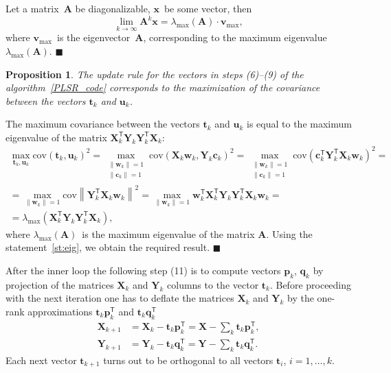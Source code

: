 \documentclass[12pt,oneside]{article}
\newtheorem{proposition}{Proposition}
\theoremstyle{definition}
\newcommand{\bx}{\mathbf{x}}
\newcommand{\bw}{\mathbf{w}}
\newcommand{\bY}{\mathbf{Y}}
\newcommand{\bX}{\mathbf{X}}
\newcommand{\bu}{\mathbf{u}}
\newcommand{\bt}{\mathbf{t}}
\newcommand{\bp}{\mathbf{p}}
\newcommand{\bq}{\mathbf{q}}
\newcommand{\bc}{\mathbf{c}}
\newcommand{\T}{\mathsf{T}}
\begin{document}
Let a matrix~$\mathbf{A}$ be diagonalizable, $\bx$~be some vector, then
\begin{equation}
\lim_{k \rightarrow \infty} \mathbf{A}^k \bx = \lambda_{\max}(\mathbf{A}) \cdot \mathbf{v}_{\max},
\end{equation}
where $\mathbf{v}_{\max}$~is the eigenvector~$\mathbf{A}$, corresponding to the maximum eigenvalue~$ \lambda_{\max} (\mathbf{A})$.
$\blacksquare$

\begin{proposition}
	The update rule for the vectors in steps (6)--(9) of the algorithm~\ref{PLSR_code} corresponds to the maximization of the covariance between the vectors $\bt_k$ and $\bu_k$.
\end{proposition}

The maximum covariance between the vectors $\bt_k$ and $\bu_k$ is equal to the maximum eigenvalue of the matrix $\bX_k^{\T} \bY_k \bY_k^{\T} \bX_k$:
\begin{multline}
\max_{\bt_k, \bu_k}  \text{cov} (\bt_k, \bu_k)^2 = \max_{\substack{\|\bw_k\|=1 \\ \|\bc_k\| = 1}} \text{cov} \left( \bX_k \bw_k, \bY_k \bc_k \right)^2 = \max_{\substack{\|\bw_k\|=1 \\ \|\bc_k\| = 1}} \text{cov} \left(\bc_k^{\T}  \bY_k^{\T} \bX_k \bw_k \right)^2 = \\
= \max_{\|\bw_k\| = 1} \text{cov} \left\|\bY_k^{\T} \bX_k \bw_k \right\|^2 = \max_{\|\bw_k\| = 1} \bw_k^{\T} \bX_k^{\T} \bY_k \bY_k^{\T} \bX_k \bw_k = \\
 = \lambda_{\max} \left( \bX_k^{\T} \bY_k \bY_k^{\T} \bX_k \right),
\end{multline}
where $ \lambda_{\max} (\mathbf{A})$~is the maximum eigenvalue of the matrix $\mathbf{A}$.
Using the statement~\ref{st:eig}, we obtain the required result.
$\blacksquare$

After the inner loop the following step (11) is to compute vectors $\bp_k$, $\bq_k$ by projection of the matrices $\bX_k$ and $\bY_k$ columns to the vector $\bt_k$. 
Before proceeding with the next iteration one has to deflate the matrices $\bX_k$ and $\bY_k$ by the one-rank approximations $\bt_k \bp_k^{\T}$ and $\bt_k \bq_k^{\T}$
\begin{align}
\bX_{k + 1} &= \bX_{k} - \bt_k \bp_k^{\T} = \bX - \sum_k \bt_k \bp_k^{\T}, \\
\bY_{k + 1} &= \bY_{k} - \bt_k \bq_k^{\T} = \bY - \sum_k \bt_k \bq_k^{\T}.
\end{align}
Each next vector $\bt_{k+1}$ turns out to be orthogonal to all vectors $\bt_i$, $i=1, \dots, k$.
\end{document}
